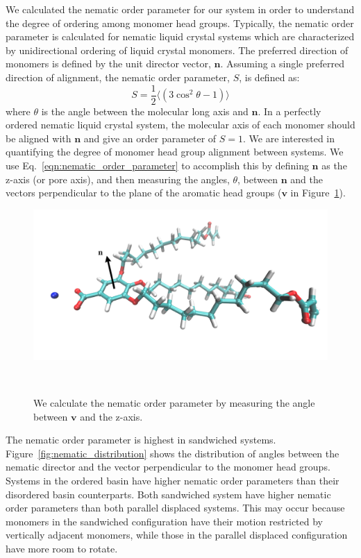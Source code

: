 \documentclass[journal=jpcbfk,manusciprt=article]{achemso}
\begin{document}
  We calculated the nematic order parameter for our system in order to
  understand the degree of ordering among monomer head groups. Typically, the
  nematic order parameter is calculated for nematic liquid crystal systems which
  are characterized by unidirectional ordering of liquid crystal monomers. The
  preferred direction of monomers is defined by the unit director vector,
  $\mathbf{n}$. Assuming a single preferred direction of alignment, the nematic
  order parameter, $S$, is defined as:
  \begin{equation}
	 S = \frac{1}{2} \langle(3\cos^2\theta -1)\rangle
	\label{eqn:nematic_order_parameter}
  \end{equation}
  where $\theta$ is the angle between the molecular long axis and $\mathbf{n}$.
  In a perfectly ordered nematic liquid crystal system, the molecular axis of each
  monomer should be aligned with $\mathbf{n}$ and give an order parameter of $S=1$. 
  We are interested in quantifying the degree of monomer head group alignment 
  between systems. We use Eq.~\ref{eqn:nematic_order_parameter} to accomplish this
  by defining $\mathbf{n}$ as the z-axis (or pore axis), and then measuring the angles,
  $\theta$, between $\mathbf{n}$ and the vectors perpendicular to the plane of
  the aromatic head groups ($\mathbf{v}$ in Figure~\ref{fig:director}). 
  
  \begin{figure}[!htb]
	\centering
	\includegraphics[width=0.75\linewidth]{nematic_director.png}
	\caption{We calculate the nematic order parameter by measuring the angle
	between $\mathbf{v}$ and the z-axis.}~\label{fig:director}
  \end{figure}

  The nematic order parameter is highest in sandwiched systems. 
  Figure~\ref{fig:nematic_distribution} shows the distribution of angles between
  the nematic director and the vector perpendicular to the monomer head groups. 
  Systems in the ordered basin have higher nematic order parameters than their
  disordered basin counterparts. Both sandwiched system have higher nematic order
  parameters than both parallel displaced systems. This may occur because monomers
  in the sandwiched configuration have their motion restricted by vertically adjacent
  monomers, while those in the parallel displaced configuration have more room to 
  rotate.
\end{document}

